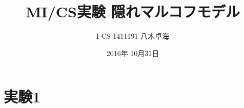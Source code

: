 \documentclass[a4paper]{jarticle}
\title{MI/CS実験 隠れマルコフモデル}
\author{I CS 1411191 八木卓海}
\date{2016年 10月31日}
\begin{document}
\maketitle
\section{実験1}
\end{document}

